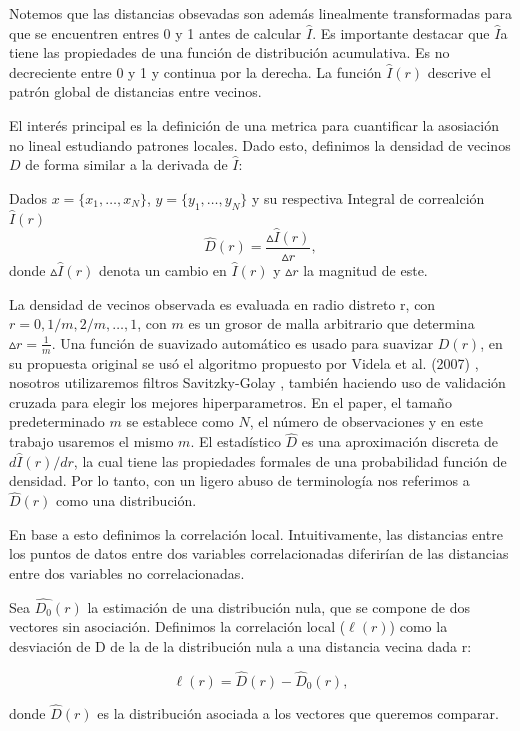 	Notemos que las distancias obsevadas son adem\'as linealmente transformadas para que se encuentren entres 0 y 1 antes de calcular $\hat{I}$. Es importante destacar que $\hat{I}$a tiene las propiedades de una funci\'on de distribuci\'on acumulativa. Es no decreciente entre 0 y 1 y continua por la derecha. La funci\'on $\hat{I}(r)$ descrive el patr\'on global de distancias entre vecinos. 

	El inter\'es principal es la definici\'on de una metrica para cuantificar la asosiaci\'on no lineal estudiando patrones locales. Dado esto, definimos la densidad de vecinos $D$ de forma similar a la derivada de $\hat{I}$: 
	\begin{defn} 
		Dados $x= \{x_1,\dots,x_N\} $, $y=\{y_1,\dots,y_N\}$ y su respectiva Integral de correalci\'on $\hat{I}(r)$
		$$
		\hat{D}(r)= \frac{\vartriangle\hat{I}(r)}{\vartriangle r},
		$$
		donde $\vartriangle\hat{I}(r)$ denota un cambio en $\hat{I}(r)$ y $\vartriangle r$ la magnitud de este.
	\end{defn}
	
	La densidad de vecinos observada es evaluada en radio distreto r, con $r=0,1/m, 2/m, \dots, 1$, con $m$ es un grosor de malla arbitrario que determina $\vartriangle r = \frac{1}{m}$. Una funci\'on de suavizado autom\'atico es usado para suavizar $D(r)$, en su propuesta original se us\'o el algoritmo propuesto por Videla et al. (2007) \cite{videla2007}, nosotros utilizaremos filtros Savitzky-Golay \cite{Savitzky-Golay}, tambi\'en haciendo uso de validaci\'on cruzada para elegir los mejores hiperparametros. En el paper, el tama\~no predeterminado $m$ se establece como $N$, el n\'umero de observaciones y en este trabajo usaremos el mismo $m$. El estad\'istico $\hat{D}$ es una aproximaci\'on discreta de $d\hat{I}(r)/d r$, la cual tiene las propiedades formales de una probabilidad funci\'on de densidad. Por lo tanto, con un ligero abuso de terminolog\'ia nos referimos a $\widehat{D}(r)$ como una distribuci\'on.

	En base a esto definimos la correlaci\'on local. Intuitivamente, las distancias entre los puntos de datos entre dos variables correlacionadas diferir\'ian de las distancias entre dos variables no correlacionadas. 
	
	\begin{defn}
	
		Sea $\widehat{D_0}(r)$ la estimaci\'on de una distribuci\'on nula, que se compone de dos vectores sin asociaci\'on. Definimos la correlaci\'on local ($\ell(r)$) como la desviaci\'on de D de la de la distribuci\'on nula a una distancia vecina dada r:

		$$
			\ell(r)=\widehat{D}(r)-\widehat{D}_{0}(r),
		$$	

		donde $\widehat{D}(r)$ es la distribuci\'on asociada a los vectores que queremos comparar.

	\end{defn}

